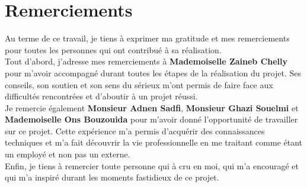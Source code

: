 \chapter*{Remerciements}
Au terme de ce travail, je tiens à exprimer ma gratitude et mes remerciements pour toutes les personnes qui ont contribué à sa réalisation.\\

Tout d’abord, j'adresse mes remerciements à \textbf{Mademoiselle Zaineb Chelly} pour m'avoir accompagné durant toutes les étapes de la réalisation du projet. Ses conseils, son soutien et son sens du sérieux m'ont permis de faire face aux difficultés rencontrées et d’aboutir à un projet réussi.\\

Je remercie également \textbf{Monsieur Adnen Sadfi}, \textbf{Monsieur Ghazi Souelmi} et \textbf{Mademoiselle Ons Bouzouida} pour m'avoir donné l’opportunité de travailler sur ce projet. Cette expérience m'a permis d’acquérir des connaissances techniques et m'a fait découvrir la vie professionnelle en me traitant comme étant un employé et non pas un externe.\\

Enfin, je tiens à remercier toute personne qui à cru en moi, qui m'a encouragé et qui m'a inspiré durant les moments fastidieux de ce projet.
